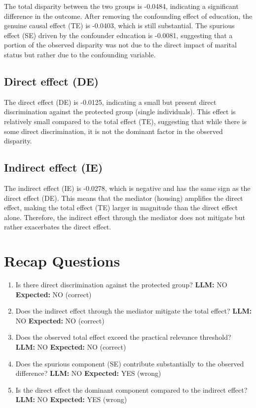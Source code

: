 \documentclass[11pt]{article}
\begin{document}
The total disparity between the two groups is -0.0484, indicating a significant difference in the outcome. After removing the confounding effect of education, the genuine causal effect (TE) is -0.0403, which is still substantial. The spurious effect (SE) driven by the confounder education is -0.0081, suggesting that a portion of the observed disparity was not due to the direct impact of marital status but rather due to the confounding variable.

\subsection{Direct effect (DE)}

The direct effect (DE) is -0.0125, indicating a small but present direct discrimination against the protected group (single individuals). This effect is relatively small compared to the total effect (TE), suggesting that while there is some direct discrimination, it is not the dominant factor in the observed disparity.

\subsection{Indirect effect (IE)}

The indirect effect (IE) is -0.0278, which is negative and has the same sign as the direct effect (DE). This means that the mediator (housing) amplifies the direct effect, making the total effect (TE) larger in magnitude than the direct effect alone. Therefore, the indirect effect through the mediator does not mitigate but rather exacerbates the direct effect.

\section{Recap Questions}

\begin{enumerate}
\item Is there direct discrimination against the protected group? \textbf{LLM:} NO \quad \textbf{Expected:} NO \quad (correct)
\item Does the indirect effect through the mediator mitigate the total effect? \textbf{LLM:} NO \quad \textbf{Expected:} NO \quad (correct)
\item Does the observed total effect exceed the practical relevance threshold? \textbf{LLM:} NO \quad \textbf{Expected:} NO \quad (correct)
\item Does the spurious component (SE) contribute substantially to the observed difference? \textbf{LLM:} NO \quad \textbf{Expected:} YES \quad (wrong)
\item Is the direct effect the dominant component compared to the indirect effect? \textbf{LLM:} NO \quad \textbf{Expected:} YES \quad (wrong)
\end{enumerate}
\end{document}
